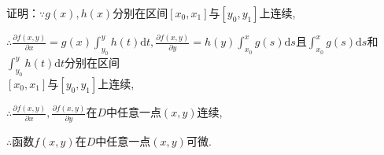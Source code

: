 \documentclass[12pt,UTF8]{ctexart}
\newcommand{\Int}[4]{\int_{#1}^{#2}#3\mathrm d#4}
\begin{document}
\begin{enumerate}
证明：$\because g(x),h(x)$分别在区间$[x_0,x_1]$与$[y_0,y_1]$上连续,

$\therefore\frac{\partial f(x,y)}{\partial x}=g(x)\int_{y_0}^yh(t)\mathrm dt,\frac{\partial f(x,y)}{\partial y}=h(y)\int_{x_0}^xg(s)\mathrm ds$且$\int_{x_0}^xg(s)\mathrm ds$和$\int_{y_0}^yh(t)\mathrm dt$分别在区间\\
$[x_0,x_1]$与$[y_0,y_1]$上连续,

$\therefore\frac{\partial f(x,y)}{\partial x},\frac{\partial f(x,y)}{\partial y}$在$D$中任意一点$(x,y)$连续,

$\therefore$函数$f(x,y)$在$D$中任意一点$(x,y)$可微.

%

\end{enumerate}
\end{document}
